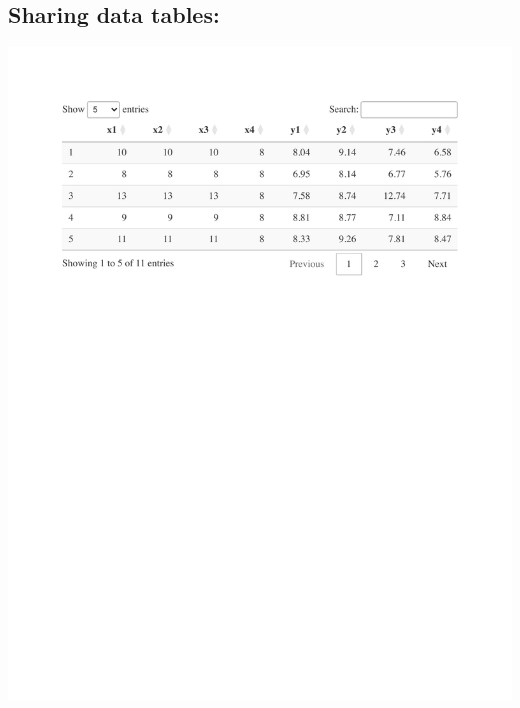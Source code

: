 \documentclass[
  letterpaper,
  DIV=11,
  numbers=noendperiod]{scrreprt}
\theoremstyle{definition}
\theoremstyle{remark}
\begin{document}
\subsection{Sharing data tables:}\label{sharing-data-tables-12}

\includegraphics{answers_files/figure-pdf/tab-anscombe-1.pdf}
\end{document}
